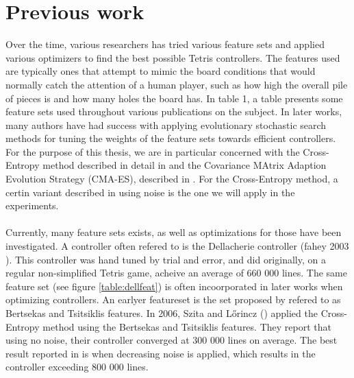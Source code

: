 \section{Previous work}

Over the time, various researchers has tried various feature 
sets and applied various optimizers to find the best 
possible Tetris controllers. The features used are typically
ones that attempt to mimic the board conditions that would
normally catch the attention of a human player, such as
how high the overall pile of pieces is and how many holes 
the board has. In \cite{scherrer2009:b} table 1, a table 
presents some feature sets used throughout various publications
on the subject. In later works, many authors have had success
with applying evolutionary stochastic search methods for tuning 
the weights of the feature sets towards
efficient controllers. For the purpose of this thesis,
we are in particular concerned with the 
Cross-Entropy method described in detail in \citep{cetut2014} and the
Covariance MAtrix Adaption Evolution Strategy (CMA-ES), described 
in \cite{hansen2011}. For the Cross-Entropy method,
a certin variant described in \cite{szita:06} using noise
is the one we will apply in the experiments.\\
\\
Currently, many feature sets exists, as well as optimizations for those have been
investigated. A controller often refered to is the Dellacherie controller 
(fahey 2003 \citep{fahey}). This controller was hand tuned by trial and error,
and did originally, on a regular non-simplified Tetris game, acheive an average of
660 000 lines. The same feature set (see figure \ref{table:dellfeat}) is 
often incoorporated in later works when optimizing controllers. An earlyer
featureset is the set proposed by \citep{Bertsekas} refered to as Bertsekas and
Tsitsiklis features. In 2006, Szita and L\H{o}rincz (\citep{szita:06}) applied the Cross-Entropy
method using the Bertsekas and Tsitsiklis features. They report that using no noise,
their controller converged at 300 000 lines on average. The best result reported in \citep{szita:06}
is when decreasing noise is applied, which results in the controller exceeding 800 000 lines.


